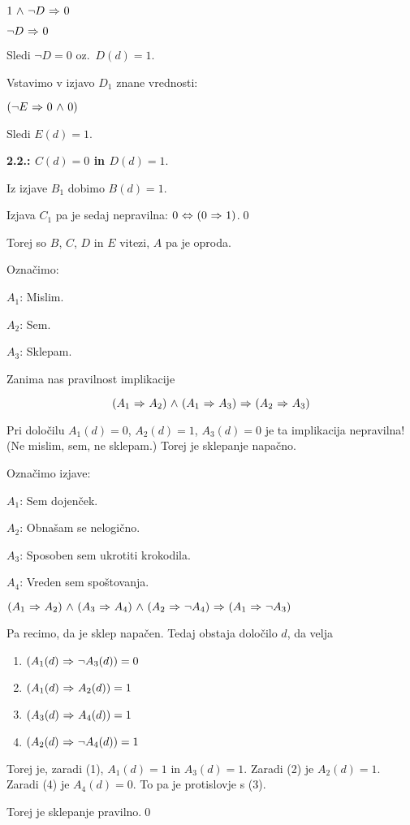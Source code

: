 \begin{answer}{1.8}
$1 {~\wedge~} \neg D{~\Rightarrow~} 0$

$\neg D{~\Rightarrow~} 0$

Sledi $\neg D = 0$ oz.~$D(d) = 1$.

Vstavimo v izjavo $D_1$ znane vrednosti:

$(\neg E {~\Rightarrow~} 0 {~\wedge~} 0)$

Sledi $E(d) = 1$.

\bigskip

\textbf{2.2.: $C(d) = 0$ in $D(d) = 1$}.

Iz izjave $B_1$ dobimo $B(d) = 1$.

Izjava $C_1$ pa je sedaj nepravilna:
$0 {~\Leftrightarrow~} (0{~\Rightarrow~} 1)$.\qed

Torej so $B$, $C$, $D$ in $E$ vitezi, $A$ pa je oproda.

\end{answer}
\begin{answer}{1.9}
Označimo:

$A_1$: Mislim.

$A_2$: Sem.

$A_3$: Sklepam.

Zanima nas pravilnost implikacije

$$(A_1{~\Rightarrow~} A_2){~\wedge~}(A_1{~\Rightarrow~} A_3){~\Rightarrow~}(A_2{~\Rightarrow~} A_3)$$

Pri določilu $A_1(d) = 0$, $A_2(d) = 1$, $A_3(d) = 0$ je ta implikacija nepravilna!
(Ne mislim, sem, ne sklepam.)
Torej je sklepanje napačno.

\end{answer}
\begin{answer}{1.10}
Označimo izjave:

$A_1$: Sem dojenček.

$A_2$: Obnašam se nelogično.

$A_3$: Sposoben sem ukrotiti krokodila.

$A_4$: Vreden sem spoštovanja.

$(A_1{~\Rightarrow~} A_2){~\wedge~} (A_3{~\Rightarrow~} A_4) {~\wedge~} (A_2{~\Rightarrow~} \neg A_4){~\Rightarrow~} (A_1{~\Rightarrow~} \neg A_3)$

Pa recimo, da je sklep napačen. Tedaj obstaja določilo $d$, da velja
\begin{enumerate}[(1)]
  \item $(A_1(d){~\Rightarrow~} \neg A_3(d)) = 0$
  \item $(A_1(d){~\Rightarrow~} A_2(d)) = 1$
  \item $(A_3(d){~\Rightarrow~} A_4(d)) = 1$
  \item $(A_2(d){~\Rightarrow~} \neg A_4(d)) = 1$
\end{enumerate}
Torej je, zaradi (1), $A_1(d) = 1$ in $A_3(d) = 1$. Zaradi (2) je $A_2(d) = 1$.
Zaradi (4) je $A_4(d) = 0$. To pa je protislovje s (3).

Torej je sklepanje pravilno.\qed
\end{answer}
